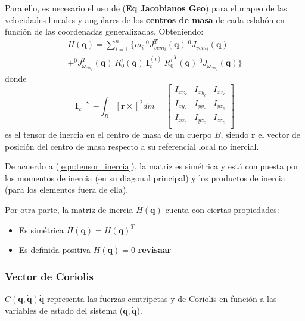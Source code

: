     Para ello, es necesario el uso de (\textbf{Eq Jacobianos Geo}) para el mapeo de las velocidades lineales y angulares de los \textbf{centros de masa}
    de cada eslabón en función de las coordenadas generalizadas. Obteniendo: 
    \begin{multline}
        \label{eqn:inertia_matrix}
        H(\boldsymbol{q}) = \sum_{i=1}^n \{ m_i \: ^0J_{v{cm_i}}^T(\boldsymbol{q}) \: ^0J_{v{cm_i}}(\boldsymbol{q}) \\ 
        + ^0J_{\omega_{cm_i}}^T (\boldsymbol{q}) \: R_0^i(\boldsymbol{q}) \: \boldsymbol{I}_c^{(i)} \: {R_0^i}^T (\boldsymbol{q}) \: {^0J_{\omega_{cm_i}}}(\boldsymbol{q}) \}
    \end{multline}
    donde 
    \begin{equation}
        \label{eqn:tensor_inercia}
        \boldsymbol{I}_c \triangleq - \int_B [\boldsymbol{r} \times]^2 dm  = 
        \begin{bmatrix}
            I_{xx_c} & I_{xy_c} & I_{xz_c} \\
            I_{xy_c} & I_{yy_c} & I_{yz_c} \\
            I_{xz_c} & I_{yz_c} & I_{zz_c} \\
        \end{bmatrix}
    \end{equation}
    es el tensor de inercia en el centro de masa de un cuerpo $B$, siendo $\boldsymbol{r}$ el vector de posición del centro de masa respecto a su referencial local no inercial.
    
    De acuerdo a (\ref{eqn:tensor_inercia}), la matriz es simétrica y está compuesta por los momentos de inercia (en su diagonal principal) y los productos de inercia 
    (para los elementos fuera de ella). 

    Por otra parte, la matriz de inercia $H(\boldsymbol{q})$ cuenta con ciertas propiedades:
    \begin{itemize}
        \item Es simétrica $H(\boldsymbol{q}) = H(\boldsymbol{q})^T$
        \item Es definida positiva $H(\boldsymbol{q})=0$ \textbf{revisaar}
    \end{itemize}

    \subsubsection{Vector de Coriolis}
    $C(\boldsymbol{q}, \boldsymbol{\dot{q}}) \boldsymbol{\dot{q}}$ representa las fuerzas centrípetas y de Coriolis 
    en función a las variables de estado del sistema ($\boldsymbol{q}, \boldsymbol{\dot{q}}$). 
    

